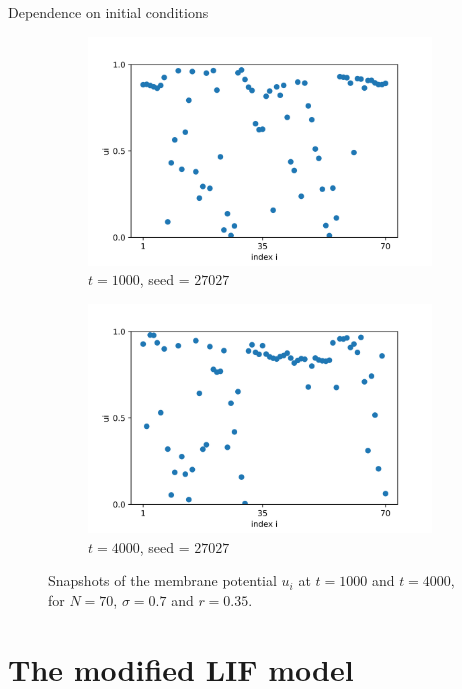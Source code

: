 \documentclass{beamer}
\begin{document}
\begin{frame}{Dependence on initial conditions}
\begin{figure}[H]
\begin{subfigure}{0.49 \textwidth}
\centering
\includegraphics[width=\linewidth]{u_seed=27027_t=1000.png}
\caption{$t=1000$, seed = $27027$}
\end{subfigure}
\hfill
\begin{subfigure}{0.49 \textwidth}
\centering
\includegraphics[width=\linewidth]{u_seed=27027_t=4000.png}
\caption{$t=4000$, seed = $27027$} 
\end{subfigure}
\caption{Snapshots of the membrane potential $u_i$ at $t=1000$ and $t=4000$, for $N=70$, $\sigma=0.7$ and $r=0.35$.}
\label{notrans}
\end{figure} 
\end{frame}

\section{The modified LIF model}
\end{document}
